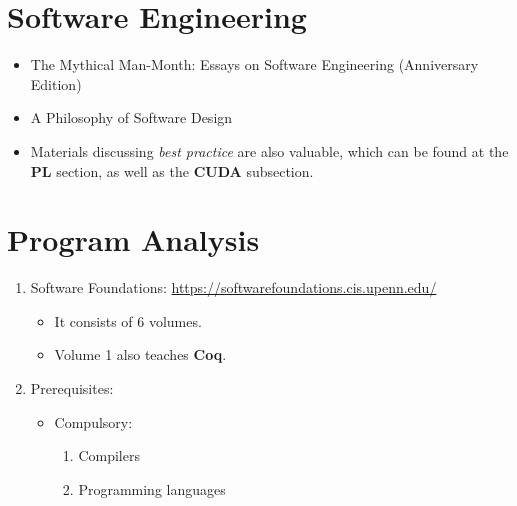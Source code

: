 \documentclass{article}
\begin{document}
\section{Software Engineering}
\begin{itemize}
    \item The Mythical Man-Month: Essays on Software Engineering (Anniversary Edition) \cite{brooks1995mythical}
    \item A Philosophy of Software Design \cite{ousterhout2018philosophy}
    \item Materials discussing \emph{best practice} are also valuable, which can be found at the \textbf{PL} section, as well as the \textbf{CUDA} subsection.
\end{itemize}

\section{Program Analysis}
\begin{enumerate}
    \item Software Foundations:
        \href{https://softwarefoundations.cis.upenn.edu/}{https://softwarefoundations.cis.upenn.edu/}
        \begin{itemize}
            \item It consists of 6 volumes.
            \item Volume 1 also teaches \textbf{Coq}.
        \end{itemize}
    \item Prerequisites:
    \begin{itemize}
        \item Compulsory:
        \begin{enumerate}
            \item Compilers
            \item Programming languages
        \end{enumerate}
    \end{itemize}
\end{enumerate}
\end{document}
